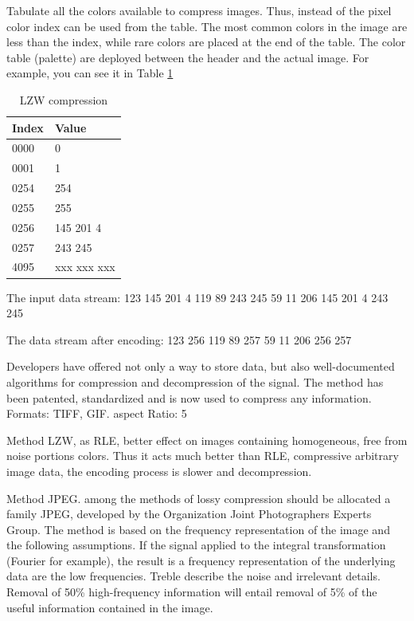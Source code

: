 Tabulate all the colors available to compress images. Thus, instead of the pixel color index can be used from the table. The most common colors in the image are less than the index, while rare colors are placed at the end of the table. The color table (palette) are deployed between the header and the actual image. For example, you can see it in Table \ref{tab:lzw}

\begin{longtable}[t]{|p{}|p{}|}
\caption{LZW compression}\label{tab:lzw} \\
	\hline
	\textbf{Index} & \textbf{Value} \\
	\hline
	\endhead
	0000 & 0\\ [2ex]
	\hline
	0001 & 1\\ [2ex]
	\hline
	0254 & 254\\ [2ex]
	\hline
	0255 & 255\\ [2ex]
	\hline
	0256 & 145 201 4\\ [2ex]
	\hline
	0257 & 243 245\\ [2ex]
	\hline
	4095 & xxx xxx xxx\\ [2ex]
	\hline
\end{longtable}

The input data stream: 123 145 201 4 119 89 243 245 59 11 206 145 201 4 243 245

The data stream after encoding: 123 256 119 89 257 59 11 206 256 257

Developers have offered not only a way to store data, but also well-documented algorithms for compression and decompression of the signal. The method has been patented, standardized and is now used to compress any information. Formats: TIFF, GIF. aspect Ratio: 5

Method LZW, as RLE, better effect on images containing homogeneous, free from noise portions colors. Thus it acts much better than RLE, compressive arbitrary image data, the encoding process is slower and decompression.

Method JPEG. among the methods of lossy compression should be allocated a family JPEG, developed by the Organization Joint Photographers Experts Group. The method is based on the frequency representation of the image and the following assumptions. If the signal applied to the integral transformation (Fourier for example), the result is a frequency representation of the underlying data are the low frequencies. Treble describe the noise and irrelevant details. Removal of 50\% high-frequency information will entail removal of 5\% of the useful information contained in the image.


